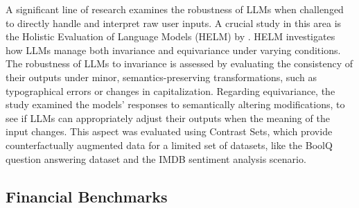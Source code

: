 A significant line of research examines the robustness of LLMs when challenged to directly handle and interpret raw user inputs. A crucial study in this area is the Holistic Evaluation of Language Models (HELM) by \citet{liang2023holisticevaluationlanguagemodels}. HELM investigates how LLMs manage both invariance and equivariance under varying conditions.
The robustness of LLMs to invariance is assessed by evaluating the consistency of their outputs under minor, semantics-preserving transformations, such as typographical errors or changes in capitalization. Regarding equivariance, the study examined the models' responses to semantically altering modifications, to see if LLMs can appropriately adjust their outputs when the meaning of the input changes. This aspect was evaluated using Contrast Sets, which provide counterfactually augmented data for a limited set of datasets, like the BoolQ question answering dataset and the IMDB sentiment analysis scenario. 


\subsection{Financial Benchmarks}

